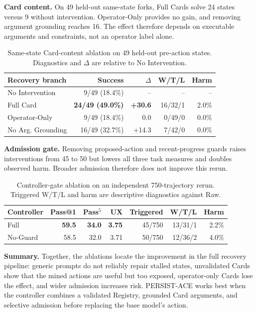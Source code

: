 \textbf{Card content.}
On 49 held-out same-state forks, Full Cards solve 24 states versus 9 without
intervention. Operator-Only provides no gain, and removing argument grounding
reaches 16. The effect therefore depends on executable arguments and
constraints, not an operator label alone.

\begin{table}[t]
\centering
\scriptsize
\setlength{\tabcolsep}{1.5pt}
\begin{tabular*}{\columnwidth}{@{\extracolsep{\fill}}lrrrr@{}}
\toprule
Recovery branch & Success & $\Delta$ & W/T/L & Harm \\
\midrule
No Intervention & 9/49 (18.4\%) & -- & -- & -- \\
Full Card & \textbf{24/49 (49.0\%)} & \textbf{+30.6} & 16/32/1 & 2.0\% \\
Operator-Only & 9/49 (18.4\%) & 0.0 & 0/49/0 & 0.0\% \\
No Arg. Grounding & 16/49 (32.7\%) & +14.3 & 7/42/0 & 0.0\% \\
\bottomrule
\end{tabular*}
\caption{Same-state Card-content ablation on 49 held-out pre-action states.
Diagnostics and $\Delta$ are relative to No Intervention.}
\label{tab:card-structure-ablation}
\end{table}

\textbf{Admission gate.}
Removing proposed-action and recent-progress guards raises interventions from
45 to 50 but lowers all three task measures and doubles observed harm. Broader
admission therefore does not improve this rerun.

\begin{table}[t]
\centering
\scriptsize
\setlength{\tabcolsep}{2pt}
\begin{tabular*}{\columnwidth}{@{\extracolsep{\fill}}lrrrrrr@{}}
\toprule
Controller & Pass@1 & Pass$^5$ & UX & Triggered & W/T/L & Harm \\
\midrule
Full & \textbf{59.5} & \textbf{34.0} & \textbf{3.75} & 45/750 & 13/31/1 & 2.2\% \\
No-Guard & 58.5 & 32.0 & 3.71 & 50/750 & 12/36/2 & 4.0\% \\
\bottomrule
\end{tabular*}
\caption{Controller-gate ablation on an independent 750-trajectory rerun.
Triggered W/T/L and harm are descriptive diagnostics against Raw.}
\label{tab:controller-gate-ablation}
\end{table}

\textbf{Summary.}
Together, the ablations locate the improvement in the full recovery pipeline:
generic prompts do not reliably repair stalled states, unvalidated Cards show
that the mined actions are useful but too exposed, operator-only Cards lose the
effect, and wider admission increases risk. PERSIST-ACE works best when the
controller combines a validated Registry, grounded Card arguments, and
selective admission before replacing the base model's action.


